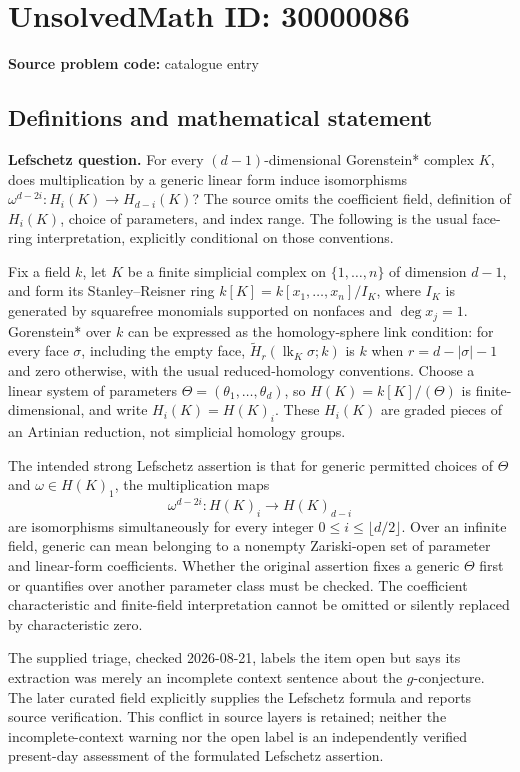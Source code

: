 \documentclass[11pt]{article}
\begin{document}
\section*{UnsolvedMath ID: 30000086}
\textbf{Source problem code:} catalogue entry
\subsection{Definitions and mathematical statement}
\textbf{Lefschetz question.} For every \((d-1)\)-dimensional Gorenstein* complex \(K\), does multiplication by a generic linear form induce isomorphisms \(\omega^{d-2i}:H_i(K)\to H_{d-i}(K)\)? The source omits the coefficient field, definition of \(H_i(K)\), choice of parameters, and index range. The following is the usual face-ring interpretation, explicitly conditional on those conventions.\par Fix a field \(k\), let \(K\) be a finite simplicial complex on \(\{1,\ldots,n\}\) of dimension \(d-1\), and form its Stanley--Reisner ring \(k[K]=k[x_1,\ldots,x_n]/I_K\), where \(I_K\) is generated by squarefree monomials supported on nonfaces and \(\deg x_j=1\). Gorenstein* over \(k\) can be expressed as the homology-sphere link condition: for every face \(\sigma\), including the empty face, \(\widetilde H_r(\operatorname{lk}_K\sigma;k)\) is \(k\) when \(r=d-|\sigma|-1\) and zero otherwise, with the usual reduced-homology conventions. Choose a linear system of parameters \(\Theta=(\theta_1,\ldots,\theta_d)\), so \(H(K)=k[K]/(\Theta)\) is finite-dimensional, and write \(H_i(K)=H(K)_i\). These \(H_i(K)\) are graded pieces of an Artinian reduction, not simplicial homology groups.\par The intended strong Lefschetz assertion is that for generic permitted choices of \(\Theta\) and \(\omega\in H(K)_1\), the multiplication maps\[\omega^{d-2i}:H(K)_i\longrightarrow H(K)_{d-i}\] are isomorphisms simultaneously for every integer \(0\le i\le\lfloor d/2\rfloor\). Over an infinite field, generic can mean belonging to a nonempty Zariski-open set of parameter and linear-form coefficients. Whether the original assertion fixes a generic \(\Theta\) first or quantifies over another parameter class must be checked. The coefficient characteristic and finite-field interpretation cannot be omitted or silently replaced by characteristic zero.\par The supplied triage, checked 2026-08-21, labels the item open but says its extraction was merely an incomplete context sentence about the \(g\)-conjecture. The later curated field explicitly supplies the Lefschetz formula and reports source verification. This conflict in source layers is retained; neither the incomplete-context warning nor the open label is an independently verified present-day assessment of the formulated Lefschetz assertion.
\end{document}
